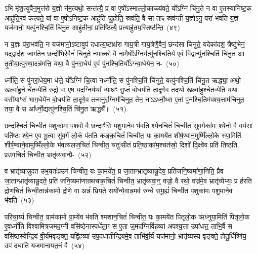 ऽभि मृ॑श॒त्युपै॑न॒मुत्त॑रो य॒ज्ञो न॑म॒त्यथो॒ सन्त॑त्यै॒ प्र वा ए॒षो᳚\-ऽस्माल्लो॒काच्च्य॑वते॒ यो᳚\-ऽग्निं चि॑नु॒ते न वा ए॒तस्या॑निष्ट॒क आहु॑ति॒रव॑ कल्पते॒ यां वा ए॒षो॑\-ऽनिष्ट॒क आहु॑तिं जु॒होति॒ स्रव॑ति॒ वै सा ताꣴ स्रव॑न्तीं य॒ज्ञो\-ऽनु॒ परा॑ भवति य॒ज्ञं यज॑मानो॒ यत्पु॑नश्चि॒तिं चि॑नु॒त आहु॑तीनां॒ प्रति॑ष्ठित्यै॒ प्रत्याहु॑तय॒स्तिष्ठ॑न्ति॒~(४९)\ip

न य॒ज्ञः प॑रा॒भव॑ति॒ न यज॑मानो॒\-ऽष्टावुप॑ दधात्य॒ष्टाक्ष॑रा गाय॒त्री गा॑य॒त्रेणै॒वैनं॒ छन्द॑सा चिनुते॒ यदेका॑\-दश॒ त्रैष्टु॑भेन॒ यद्द्वाद॑श॒ जाग॑तेन॒ छन्दो॑भिरे॒वैनं॑ चिनुते नपा॒त्को वै नामै॒षो᳚\-ऽग्निर्यत्पु॑नश्चि॒तिर्य ए॒वं वि॒द्वान्पु॑नश्चि॒तिं चि॑नु॒त आ तृ॒तीया॒त्पुरु॑षा॒दन्न॑मत्ति॒ यथा॒ वै पु॑नरा॒धेय॑ ए॒वं पु॑नश्चि॒तिर्यो᳚\-ऽग्न्या॒धेये॑न॒ न-~(५०)\ip

र्ध्नोति॒ स पु॑नरा॒धेय॒मा ध॑त्ते॒ यो᳚\-ऽग्निं चि॒त्वा नर्ध्नोति॒ स पु॑नश्चि॒तिं चि॑नुते॒ यत्पु॑नश्चि॒तिं चि॑नु॒त ऋद्ध्या॒ अथो॒ खल्वा॑हु॒र्न चे॑त॒व्येति॑ रु॒द्रो वा ए॒ष यद॒ग्निर्यथा᳚ व्या॒घ्रꣳ सु॒प्तं बो॒धय॑ति ता॒दृगे॒व तदथो॒ खल्वा॑हुश्चेत॒व्येति॒ यथा॒ वसी॑याꣳसं भाग॒\-धेये॑न बो॒धय॑ति ता॒दृगे॒व तन्मनु॑र॒ग्निम॑चिनुत॒ तेन॒ ना\-ऽऽर्ध्नो॒थ्स ए॒तां पु॑नश्चि॒तिम॑पश्य॒त्ताम॑चिनुत॒ तया॒ वै स आ᳚र्ध्नो॒द्यत्पु॑नश्चि॒तिं चि॑नु॒त ऋद्ध्यै᳚॥~(५१)\ip

{\anuvakamend[{त्रि॒वृदथ॒ तिष्ठ॑न्त्यग्न्या॒धेये॑न॒ नाचि॑नुत स॒प्तद॑श च}]}%

छ॒न्द॒श्चितं॑ चिन्वीत प॒शुका॑मः प॒शवो॒ वै छन्दाꣳ॑सि पशु॒माने॒व भ॑वति श्येन॒चितं॑ चिन्वीत सुव॒र्गका॑मः श्ये॒नो वै वय॑सां॒ पति॑ष्ठः श्ये॒न ए॒व भू॒त्वा सु॑व॒र्गं लो॒कं प॑तति कङ्क॒चितं॑ चिन्वीत॒ यः का॒मये॑त शीर्\mbox{}ष॒ण्वान॒मुष्मिँ॑ल्लो॒के स्या॒मिति॑ शीर्\mbox{}ष॒ण्वाने॒वामुष्मिँ॑ल्लो॒के भ॑वत्यलज॒चितं॑ चिन्वीत॒ चतुः॑सीतं प्रति॒ष्ठाका॑म॒श्चत॑स्रो॒ दिशो॑ दि॒क्ष्वे॑व प्रति॑ तिष्ठति प्रउग॒चितं॑ चिन्वीत॒ भ्रातृ॑व्यवा॒न्प्रै-~(५२)\ip

व भ्रातृ॑व्यान्नुदत उभ॒यतः॑प्रउगं चिन्वीत॒ यः का॒मये॑त॒ प्र जा॒तान्भ्रातृ॑व्यान्नु॒देय॒ प्रति॑जनि॒ष्यमा॑णा॒निति॒ प्रैव जा॒तान्भ्रातृ॑व्यान्नु॒दते॒ प्रति॑ जनि॒ष्यमा॑णान्रथचक्र॒चितं॑ चिन्वीत॒ भ्रातृ॑व्यवा॒न्॒ वज्रो॒ वै रथो॒ वज्र॑मे॒व भ्रातृ॑व्येभ्यः॒ प्र ह॑रति द्रोण॒चितं॑ चिन्वी॒तान्न॑कामो॒ द्रोणे॒ वा अन्नं॑ भ्रियते॒ सयो᳚न्ये॒वान्न॒मव॑ रुन्धे समू॒ह्यं॑ चिन्वीत प॒शुका॑मः पशु॒माने॒व भ॑वति~(५३)\ip

परिचा॒य्यं॑ चिन्वीत॒ ग्राम॑कामो ग्रा॒म्ये॑व भ॑वति श्मशान॒चितं॑ चिन्वीत॒ यः का॒मये॑त पितृलो॒क ऋ॑ध्नुया॒मिति॑ पितृलो॒क ए॒वर्ध्नो॑ति विश्वामित्रजमद॒ग्नी वसि॑ष्ठेनास्पर्धेता॒ꣳ॒ स ए॒ता ज॒मद॑ग्निर्विह॒व्या॑ अपश्य॒त्ता उपा॑धत्त॒ ताभि॒र्वै स वसि॑ष्ठस्येन्द्रि॒यं वी॒र्य॑मवृङ्क्त॒ यद्वि॑ह॒व्या॑ उप॒\-दधा॑तीन्द्रि॒यमे॒व ताभि॑र्वी॒र्यं॑ यज॑मानो॒ भ्रातृ॑व्यस्य वृङ्क्ते॒ होतु॒र्धिष्णि॑य॒ उप॑ दधाति यजमानायत॒नं वै~(५४)\ip

